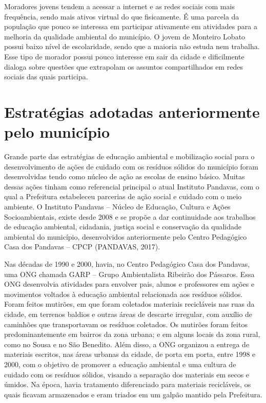 Moradores jovens tendem a acessar a internet e as redes sociais com mais frequência, sendo mais ativos virtual do que fisicamente. É uma parcela da população que pouco se interessa em participar ativamente em atividades para a melhoria da qualidade ambiental do município. O jovem de Monteiro Lobato possui baixo nível de escolaridade, sendo que a maioria não estuda nem trabalha. Esse tipo de morador possui pouco interesse em sair da cidade e dificilmente dialoga sobre questões que extrapolam os assuntos compartilhados em redes sociais das quais participa.

\section{Estratégias adotadas anteriormente pelo município}

Grande parte das estratégias de educação ambiental e mobilização social para o desenvolvimento de ações de cuidado com os resíduos sólidos do município foram desenvolvidas tendo como núcleo de ação as escolas de ensino básico. Muitas dessas ações tinham como referencial principal o atual Instituto Pandavas, com o qual a Prefeitura estabeleceu parcerias de ação social e cuidado com o meio ambiente. O Instituto Pandavas – Núcleo de Educação, Cultura e Ações Socioambientais, existe desde 2008 e se propõe a dar continuidade aos trabalhos de educação ambiental, cidadania, justiça social e conservação da qualidade ambiental do município, desenvolvidos anteriormente pelo Centro Pedagógico Casa dos Pandavas – CPCP (PANDAVAS, 2017).

Nas décadas de 1990 e 2000, havia, no Centro Pedagógico Casa dos Pandavas, uma ONG chamada GARP – Grupo Ambientalista Ribeirão dos Pássaros. Essa ONG desenvolvia atividades para envolver pais, alunos e professores em ações e movimentos voltados à educação ambiental relacionada aos resíduos sólidos. Foram feitos mutirões, em que foram coletados materiais recicláveis nas ruas da cidade, em terrenos baldios e outras áreas de descarte irregular, com auxílio de caminhões que transportavam os resíduos coletados. Os mutirões foram feitos predominantemente em bairros da zona urbana; e em alguns locais da zona rural, como no Sousa e no São Benedito. Além disso, a ONG organizou a entrega de materiais escritos, nas áreas urbanas da cidade, de porta em porta, entre 1998 e 2000, com o objetivo de promover a educação ambiental e uma cultura de cuidado com os resíduos sólidos, visando a separação dos materiais em secos e úmidos. Na época, havia tratamento diferenciado para materiais recicláveis, os quais ficavam armazenados e eram triados em um galpão mantido pela Prefeitura.

